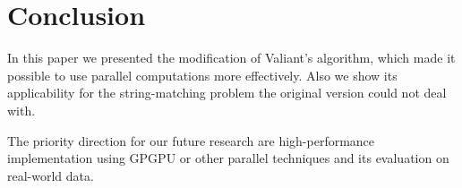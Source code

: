 \section{\bf Conclusion}

In this paper we presented the modification of Valiant's algorithm, which made it possible to use parallel computations more effectively. Also we show its applicability for the string-matching problem the original version could not deal with.

The priority direction for our future research are high-performance implementation using GPGPU or other parallel techniques 
and its evaluation on real-world data. 

